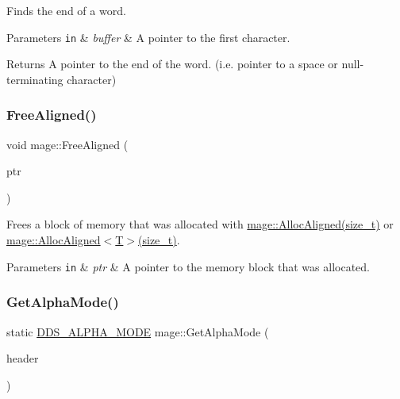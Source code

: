 Finds the end of a word.


\begin{DoxyParams}[1]{Parameters}
\mbox{\tt in}  & {\em buffer} & A pointer to the first character. \\
\hline
\end{DoxyParams}
\begin{DoxyReturn}{Returns}
A pointer to the end of the word. (i.\+e. pointer to a space or null-\/terminating character) 
\end{DoxyReturn}
\hypertarget{namespacemage_a401c54df21447c491c527735647b5f80}{}\label{namespacemage_a401c54df21447c491c527735647b5f80} 
\subsubsection{\texorpdfstring{Free\+Aligned()}{FreeAligned()}}
{\footnotesize\ttfamily void mage\+::\+Free\+Aligned (\begin{DoxyParamCaption}\item[{void $\ast$}]{ptr }\end{DoxyParamCaption})}

Frees a block of memory that was allocated with \hyperlink{namespacemage_a6c97f75df305a5e0a945e82a26e75c38}{mage\+::\+Alloc\+Aligned(size\+\_\+t)} or \hyperlink{namespacemage_a6c97f75df305a5e0a945e82a26e75c38}{mage\+::\+Alloc\+Aligned$<$\+T$>$(size\+\_\+t)}.


\begin{DoxyParams}[1]{Parameters}
\mbox{\tt in}  & {\em ptr} & A pointer to the memory block that was allocated. \\
\hline
\end{DoxyParams}
\hypertarget{namespacemage_afcc0891e1660f8457696cb30f4ee518a}{}\label{namespacemage_afcc0891e1660f8457696cb30f4ee518a} 
\subsubsection{\texorpdfstring{Get\+Alpha\+Mode()}{GetAlphaMode()}}
{\footnotesize\ttfamily static \hyperlink{namespacemage_a0c586a2bad862f4858900ca121ca80c2}{D\+D\+S\+\_\+\+A\+L\+P\+H\+A\+\_\+\+M\+O\+DE} mage\+::\+Get\+Alpha\+Mode (\begin{DoxyParamCaption}\item[{\+\_\+\+In\+\_\+ const \hyperlink{structmage_1_1_d_d_s___h_e_a_d_e_r}{D\+D\+S\+\_\+\+H\+E\+A\+D\+ER} $\ast$}]{header }\end{DoxyParamCaption})\hspace{0.3cm}{\ttfamily [static]}}

